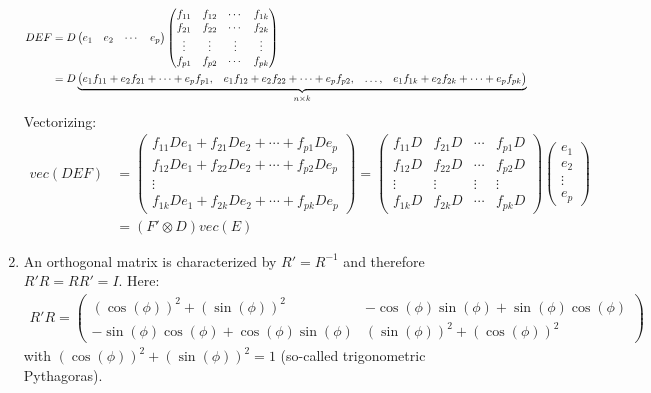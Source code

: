 \begin{enumerate}
\begingroup\scriptsize
\begin{align*}
DEF &= D \begin{pmatrix} e_1 & e_2 & \cdots & e_p \end{pmatrix}
\begin{pmatrix}
f_{11} &f_{12} &\cdots &f_{1k} \\
f_{21} &f_{22} &\cdots &f_{2k} \\
\vdots &\vdots &\vdots &\vdots \\
f_{p1} &f_{p2} &\cdots &f_{pk}
\end{pmatrix}
\\
&= D \underbrace{%
  \begin{pmatrix}
  e_1 f_{11} + e_2 f_{21} + \cdots + e_p f_{p1}, &
  e_1 f_{12} + e_2 f_{22} + \cdots + e_p f_{p2}, &
  \dots ,&
  e_1 f_{1k} + e_2 f_{2k} + \cdots + e_p f_{pk}
  \end{pmatrix}
}_{n\times k}
\end{align*}
\endgroup
Vectorizing:
\begin{align*}
vec(DEF) &=
\begin{pmatrix}
f_{11} D e_1 + f_{21} D e_2 + \cdots + f_{p1} D e_p \\
f_{12} D e_1 + f_{22} D e_2 + \cdots + f_{p2} D e_p \\
\vdots \\
f_{1k} D e_1 + f_{2k} D e_2 + \cdots + f_{pk} D e_p
\end{pmatrix}
=
\begin{pmatrix}
f_{11} D & f_{21} D & \cdots & f_{p1} D \\
f_{12} D & f_{22} D & \cdots & f_{p2} D \\
\vdots & \vdots & \vdots & \vdots \\
f_{1k}D & f_{2k} D & \cdots & f_{pk} D
\end{pmatrix}
\begin{pmatrix} e_1 \\ e_2 \\ \vdots \\ e_p \end{pmatrix}
\\
&= \left(F'\otimes D\right) vec(E)
\end{align*}

\item An orthogonal matrix is characterized by \(R'=R^{-1}\) and therefore \(R'R=R R' = I\).
Here:
\begin{align*}
R'R =
\begin{pmatrix}
{(\cos(\phi))}^2 + {(\sin(\phi))}^2 & -\cos(\phi)\sin(\phi) + \sin(\phi)\cos(\phi)
\\
-\sin(\phi)\cos(\phi) + \cos(\phi)\sin(\phi) & {(\sin(\phi))}^2 + {(\cos(\phi))}^2
\end{pmatrix}
\end{align*}
with \({(\cos(\phi))}^2 + {(\sin(\phi))}^2 = 1\) (so-called trigonometric Pythagoras).


\end{enumerate}
